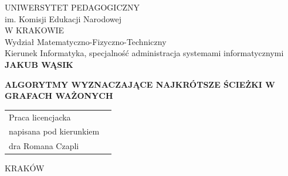 \documentclass[12pt,a4paper]{book}
\theoremstyle{definition}
\numberwithin{equation}{chapter}
\begin{document}
\begin{titlepage}
\begin{center}
{\Large UNIWERSYTET PEDAGOGICZNY}\\[0.2cm]
{\Large im. Komisji Edukacji Narodowej}\\[0.2cm]
{\Large W KRAKOWIE}\\[0.2cm]
{\Large Wydział Matematyczno-Fizyczno-Techniczny}\\[0.2cm]
{\Large Kierunek Informatyka, specjalność administracja systemami informatycznymi}\\[4.cm]

{\Large \textbf{JAKUB WĄSIK} \\[1.0cm] }

{\LARGE \textbf{ALGORYTMY WYZNACZAJĄCE NAJKRÓTSZE ŚCIEŻKI W GRAFACH WAŻONYCH} \\[6.0cm] }

\begin{flushright}
\large
  \begin{tabular}{ll}
	Praca licencjacka\\
	napisana pod kierunkiem\\ 
	dra Romana Czapli
  \end{tabular}
\end{flushright}


\vfill

{\large KRAKÓW \the\year}

\end{center}
\end{titlepage}

\tableofcontents
\newpage

\end{document}
